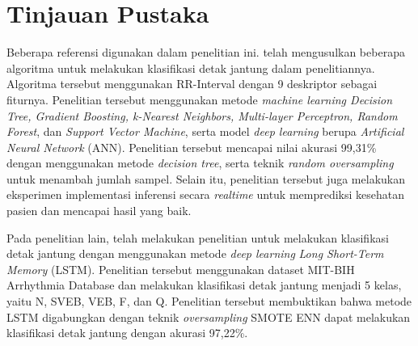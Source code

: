 



\section{Tinjauan Pustaka}

Beberapa referensi digunakan dalam penelitian ini. 
\textcite{pramukantoroHeartbeatClassifierContinuous2022} telah mengusulkan beberapa algoritma untuk melakukan klasifikasi detak jantung dalam penelitiannya. 
Algoritma tersebut menggunakan RR-Interval dengan 9 deskriptor sebagai fiturnya.
Penelitian tersebut menggunakan metode \textit{machine learning Decision Tree, Gradient Boosting, k-Nearest Neighbors, Multi-layer Perceptron, Random Forest}, dan \textit{Support Vector Machine}, serta model \textit{deep learning} berupa \textit{Artificial Neural Network} (ANN). 
Penelitian tersebut mencapai nilai akurasi 99,31\% dengan menggunakan metode \textit{decision tree}, serta teknik \textit{random oversampling} untuk menambah jumlah sampel.
Selain itu, penelitian tersebut juga melakukan eksperimen implementasi inferensi secara \textit{realtime} untuk memprediksi kesehatan pasien dan mencapai hasil yang baik.


Pada penelitian lain, \textcite{shchetininArrhythmiaDetectionUsing2022} telah melakukan penelitian untuk melakukan klasifikasi detak jantung dengan menggunakan metode \textit{deep learning} \textit{Long Short-Term Memory} (LSTM). 
Penelitian tersebut menggunakan dataset MIT-BIH Arrhythmia Database dan melakukan klasifikasi detak jantung menjadi 5 kelas, yaitu N, SVEB, VEB, F, dan Q.
Penelitian tersebut membuktikan bahwa metode LSTM digabungkan dengan teknik \textit{oversampling} SMOTE ENN dapat melakukan klasifikasi detak jantung dengan akurasi 97,22\%. 


